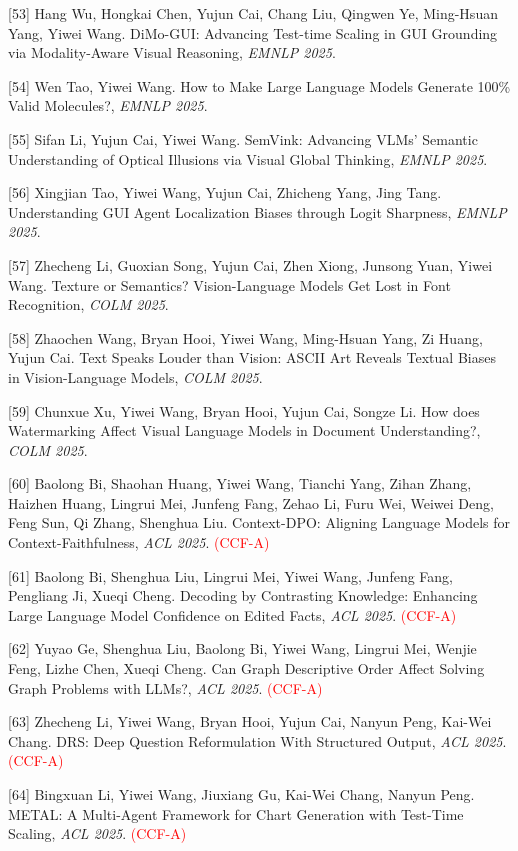 [53] Hang Wu, Hongkai Chen, Yujun Cai, Chang Liu, Qingwen Ye, Ming-Hsuan Yang, Yiwei Wang. DiMo-GUI: Advancing Test-time Scaling in GUI Grounding via Modality-Aware Visual Reasoning, \textit{EMNLP 2025}.

[54] Wen Tao, Yiwei Wang. How to Make Large Language Models Generate 100\% Valid Molecules?, \textit{EMNLP 2025}.

[55] Sifan Li, Yujun Cai, Yiwei Wang. SemVink: Advancing VLMs' Semantic Understanding of Optical Illusions via Visual Global Thinking, \textit{EMNLP 2025}.

[56] Xingjian Tao, Yiwei Wang, Yujun Cai, Zhicheng Yang, Jing Tang. Understanding GUI Agent Localization Biases through Logit Sharpness, \textit{EMNLP 2025}.

[57] Zhecheng Li, Guoxian Song, Yujun Cai, Zhen Xiong, Junsong Yuan, Yiwei Wang. Texture or Semantics? Vision-Language Models Get Lost in Font Recognition, \textit{COLM 2025}.

[58] Zhaochen Wang, Bryan Hooi, Yiwei Wang, Ming-Hsuan Yang, Zi Huang, Yujun Cai. Text Speaks Louder than Vision: ASCII Art Reveals Textual Biases in Vision-Language Models, \textit{COLM 2025}.

[59] Chunxue Xu, Yiwei Wang, Bryan Hooi, Yujun Cai, Songze Li. How does Watermarking Affect Visual Language Models in Document Understanding?, \textit{COLM 2025}.

[60] Baolong Bi, Shaohan Huang, Yiwei Wang, Tianchi Yang, Zihan Zhang, Haizhen Huang, Lingrui Mei, Junfeng Fang, Zehao Li, Furu Wei, Weiwei Deng, Feng Sun, Qi Zhang, Shenghua Liu. Context-DPO: Aligning Language Models for Context-Faithfulness, \textit{ACL 2025}. \textcolor{red}{(CCF-A)}

[61] Baolong Bi, Shenghua Liu, Lingrui Mei, Yiwei Wang, Junfeng Fang, Pengliang Ji, Xueqi Cheng. Decoding by Contrasting Knowledge: Enhancing Large Language Model Confidence on Edited Facts, \textit{ACL 2025}. \textcolor{red}{(CCF-A)}

[62] Yuyao Ge, Shenghua Liu, Baolong Bi, Yiwei Wang, Lingrui Mei, Wenjie Feng, Lizhe Chen, Xueqi Cheng. Can Graph Descriptive Order Affect Solving Graph Problems with LLMs?, \textit{ACL 2025}. \textcolor{red}{(CCF-A)}

[63] Zhecheng Li, Yiwei Wang, Bryan Hooi, Yujun Cai, Nanyun Peng, Kai-Wei Chang. DRS: Deep Question Reformulation With Structured Output, \textit{ACL 2025}. \textcolor{red}{(CCF-A)}

[64] Bingxuan Li, Yiwei Wang, Jiuxiang Gu, Kai-Wei Chang, Nanyun Peng. METAL: A Multi-Agent Framework for Chart Generation with Test-Time Scaling, \textit{ACL 2025}. \textcolor{red}{(CCF-A)}

